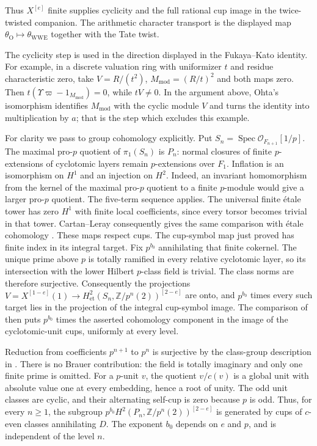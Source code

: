 \documentclass[11pt]{article}
\theoremstyle{definition}\newtheorem{definition}[theorem]{Definition}
\newcommand{\Z}{\mathbb Z}\newcommand{\Q}{\mathbb Q}
\begin{document}
Thus $X^{[e]}$ finite supplies cyclicity and the full rational
cup image in the twice-twisted companion.  The arithmetic character
transport is the displayed map $\theta_{\mathrm O}\mapsto
\theta_{\mathrm{WWE}}$ together with the Tate twist.

The cyclicity step is used in the direction displayed in the
Fukaya--Kato identity. For example, in a discrete valuation ring
with uniformizer $t$ and residue characteristic zero, take
$V=R/(t^2)$, $M_{\mathrm{mod}}=(R/t)^2$ and both maps zero. Then
$t(\Upsilon\varpi-1_{M_{\mathrm{mod}}})=0$, while $tV\ne0$.
In the argument above, Ohta's isomorphism identifies $M_{\mathrm{mod}}$ with the
cyclic module $V$ and turns the identity into multiplication by
$a$; that is the step which excludes this example.


For clarity we pass to group cohomology explicitly.
Put $S_n=\operatorname{Spec}\mathcal O_{F_{n+1}}[1/p]$.
The maximal pro-$p$ quotient of $\pi_1(S_n)$ is $P_n$:
normal closures of finite $p$-extensions of cyclotomic layers
remain $p$-extensions over $F_1$.
Inflation is an isomorphism on $H^1$ and an injection on $H^2$.
Indeed, an invariant homomorphism from the kernel of the
maximal pro-$p$ quotient to a finite $p$-module would give
a larger pro-$p$ quotient. The five-term sequence applies.
The universal finite \'etale tower has zero $H^1$ with finite
local coefficients, since every torsor becomes trivial in
that tower. Cartan--Leray consequently gives the same comparison
with \'etale cohomology \cite[Theorem~14.9 and
Proposition~14.13, pp.~96--98]{MilneEtale}.
These maps respect cups. The cup-symbol map just proved has
finite index in its integral target. Fix $p^{b_0}$ annihilating
that finite cokernel. The unique prime above $p$ is totally
ramified in every relative cyclotomic layer, so its intersection
with the lower Hilbert $p$-class field is trivial. The class norms
are therefore surjective. Consequently the projections
$V=X^{[1-e]}(1)\to H^2_{\mathrm{et}}(S_n,\Z/p^n(2))^{[2-e]}$
are onto, and $p^{b_0}$ times every such target lies in the
projection of the integral cup-symbol image. The comparison of
\cite[\S\S7.1.9--7.1.10, p.~86]{FK} then puts
$p^{b_0}$ times the asserted cohomology component in the image
of the cyclotomic-unit cups, uniformly at every level.

Reduction from coefficients $p^{n+1}$ to $p^n$ is surjective
by the class-group description in \cite[\S7.1.9]{FK}.
There is no Brauer contribution: the field is totally imaginary
and only one finite prime is omitted.
For a $p$-unit $v$, the quotient $v/c(v)$ is a global unit
with absolute value one at every embedding, hence a root of
unity. The odd unit classes are cyclic, and their alternating
self-cup is zero because $p$ is odd. Thus, for every $n\geq1$,
the subgroup $p^{b_0}H^2(P_n,\Z/p^n(2))^{[2-e]}$
is generated by cups of $c$-even classes annihilating $D$.
The exponent $b_0$ depends on $e$ and $p$, and is independent
of the level $n$.
\end{document}
